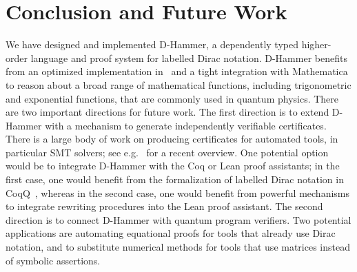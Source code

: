 



\section{Conclusion and Future Work}
We have designed and implemented D-Hammer, a dependently typed
higher-order language and proof system for labelled Dirac
notation. D-Hammer benefits from an optimized implementation in
\CC\ and a tight integration with Mathematica to reason about a broad
range of mathematical functions, including trigonometric and
exponential functions, that are commonly used in quantum physics.
There are two important directions for future work. 
The first direction is to extend D-Hammer with a mechanism to
generate independently verifiable certificates.  There is a large body
of work on producing certificates for automated tools, in particular
SMT solvers; see e.g.~\cite{DBLP:journals/cacm/BarbosaBCDKLNNOPRTZ23}
for a recent overview. One potential option would be to integrate
D-Hammer with the Coq or Lean proof assistants; in the first case, one
would benefit from the formalization of labelled Dirac notation in
CoqQ~\cite{Zhou2023}, whereas in the second case, one would benefit
from powerful mechanisms to integrate rewriting procedures into the
Lean proof assistant. The second direction is to connect
D-Hammer with quantum program verifiers. Two potential applications
are automating equational proofs for tools that already use Dirac
notation, and to substitute numerical methods for tools that use
matrices instead of symbolic assertions.





